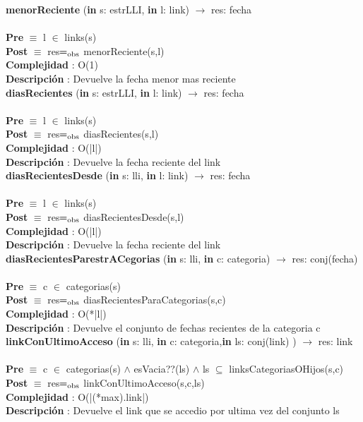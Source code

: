 	\textbf{menorReciente} (\textbf{in} s: estrLLI, \textbf{in} l: link) $\longrightarrow$ res: fecha\\\\
	\textbf{Pre} $\equiv$ {l $\in$ links(s)}\\
	\textbf{Post} $\equiv$ {res$=_{\mathrm{obs}}$ menorReciente(s,l)}\\
	\textbf{Complejidad} : O(1)\\
	\textbf{Descripci\'{o}n} : Devuelve la fecha menor mas reciente\\
	
	\textbf{diasRecientes} (\textbf{in} s: estrLLI, \textbf{in} l: link) $\longrightarrow$ res: fecha\\\\
	\textbf{Pre} $\equiv$ {l $\in$ links(s)}\\
	\textbf{Post} $\equiv$ {res$=_{\mathrm{obs}}$ diasRecientes(s,l)}\\
	\textbf{Complejidad} : O(|l|)\\
	\textbf{Descripci\'{o}n} : Devuelve la fecha reciente del link\\

	
	\textbf{diasRecientesDesde} (\textbf{in} s: lli, \textbf{in} l: link) $\longrightarrow$ res: fecha\\\\
	\textbf{Pre} $\equiv$ {l $\in$ links(s)}\\
	\textbf{Post} $\equiv$ {res$=_{\mathrm{obs}}$ diasRecientesDesde(s,l)}\\
	\textbf{Complejidad} : O(|l|)\\
	\textbf{Descripci\'{o}n} : Devuelve la fecha reciente del link\\

	
	\textbf{diasRecientesParestrACegorias} (\textbf{in} s: lli, \textbf{in} c: categoria) $\longrightarrow$ res: conj(fecha)\\\\
	\textbf{Pre} $\equiv$ {c $\in$ categorias(s)}\\
	\textbf{Post} $\equiv$ {res$=_{\mathrm{obs}}$ diasRecientesParaCategorias(s,c)}\\
	\textbf{Complejidad} : O(*|l|)\\
	\textbf{Descripci\'{o}n} : Devuelve el conjunto de fechas recientes de la categoria c\\
	
	\textbf{linkConUltimoAcceso} (\textbf{in} s: lli, \textbf{in} c: categoria,\textbf{in} ls: conj(link) ) $\longrightarrow$ res: link\\\\
	\textbf{Pre} $\equiv$ {c $\in$ categorias(s) $\wedge$ esVacia??(ls) $\wedge$ ls $\subseteq$ linksCategoriasOHijos(s,c)}\\
	\textbf{Post} $\equiv$ {res$=_{\mathrm{obs}}$ linkConUltimoAcceso(s,c,ls)}\\
	\textbf{Complejidad} : O(|(*max).link|)\\
	\textbf{Descripci\'{o}n} : Devuelve el link que se accedio por ultima vez del conjunto ls\\
	
